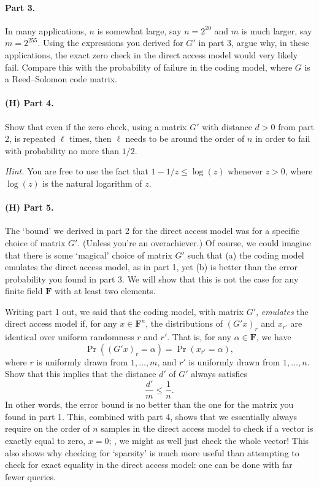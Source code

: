 \documentclass[12pt]{article}
\newcommand{\field}{\mathbf{F}}
\begin{document}
\paragraph{Part 3.} In many applications, $n$ is somewhat large, say $n=2^{20}$
and $m$ is much larger, say $m=2^{255}$. Using the expressions you derived for
$G'$ in part 3, argue why, in these applications, the exact zero check in the
direct access model would very likely fail. Compare this with the probability
of failure in the coding model, where $G$ is a Reed--Solomon code matrix. 

\paragraph{(H) Part 4.} Show that even if the zero check, using a matrix $G'$
with distance $d > 0$ from part 2, is repeated $\ell$ times, then $\ell$ needs
to be around the order of $n$ in order to fail with probability no more than
$1/2$.

\emph{Hint.} You are free to use the fact that $1-1/z \le \log(z)$ whenever $z
> 0$, where $\log(z)$ is the natural logarithm of $z$.

\paragraph{(H) Part 5.} The `bound' we derived in part 2 for the direct access
model was for a specific choice of matrix $G'$. (Unless you're an overachiever.)
Of course, we could imagine that there is some `magical' choice of matrix $G'$
such that (a) the coding model emulates the direct access model, as in part 1,
yet (b) is better than the error probability you found in part 3. We will
show that this is not the case for any finite field $\field$ with at least two
elements.

Writing part 1 out, we said that the coding model, with matrix $G'$,
\emph{emulates} the direct access model if, for any $x \in \field^n$, the
distributions of $(G'x)_r$ and $x_{r'}$ are identical over uniform randomness
$r$ and $r'$. That is, for any $\alpha \in \field$, we have
\[
    \Pr((G'x)_r = \alpha) = \Pr(x_{r'} = \alpha),
\]
where $r$ is uniformly drawn from $1, \dots, m$, and $r'$ is uniformly drawn
from $1, \dots, n$. Show that this implies that the distance $d'$ of $G'$
always satisfies
\[
    \frac{d'}{m} \le \frac{1}{n}.
\]
In other words, the error bound is no better than the one for the matrix you
found in part 1. This, combined with part 4, shows that we essentially always
require on the order of $n$ samples in the direct access model to check if a
vector is exactly equal to zero, $x = 0$; \ie, we might as well just check the
whole vector! This also shows why checking for `sparsity' is much more useful
than attempting to check for exact equality in the direct access model: one
can be done with far fewer queries.
\end{document}
